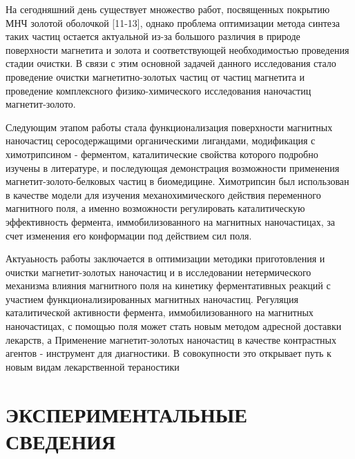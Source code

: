 \documentclass[10pt, a4paper]{article}
\begin{document}
На сегодняшний день существует множество работ, посвященных покрытию МНЧ золотой оболочкой [11-13], однако проблема
оптимизации метода синтеза таких частиц остается актуальной из-за большого различия в природе поверхности магнетита и золота и соответствующей необходимостью проведения стадии очистки. 
В связи с этим основной задачей данного исследования стало проведение очистки магнетитно-золотых частиц от частиц магнетита и проведение комплексного
физико-химического исследования наночастиц магнетит-золото.

Следующим этапом работы стала функционализация поверхности магнитных наночастиц серосодержащими органическими
лигандами, модификация с химотрипсином - ферментом, каталитические свойства которого подробно изучены в литературе, и
последующая демонстрация возможности применения магнетит-золото-белковых частиц в биомедицине. Химотрипсин был
использован в качестве модели для изучения механохимического действия переменного магнитного поля, а именно возможности регулировать
каталитическую эффективность фермента, иммобилизованного на магнитных наночастицах, за счет изменения его конформации под
действием сил поля.

Актуаьность работы заключается в оптимизации методики приготовления и очистки магнетит-золотых наночастиц и в исследовании нетермического механизма влияния магнитного поля на кинетику
ферментативных реакций с участием функционализированных магнитных наночастиц. Регуляция каталитической активности
фермента, иммобилизованного на магнитных наночастицах, с помощью поля может стать новым методом адресной доставки лекарств, а
Применение магнетит-золотых наночастиц в качестве контрастных агентов - инструмент для диагностики. В совокупности это открывает
путь к новым видам лекарственной тераностики

\section*{ЭКСПЕРИМЕНТАЛЬНЫЕ СВЕДЕНИЯ}
\end{document}
